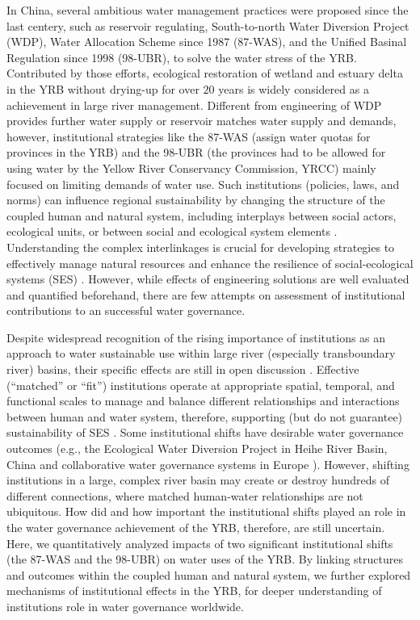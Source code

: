 In China, several ambitious water management practices were proposed since the last centery, such as reservoir regulating, South-to-north Water Diversion Project (WDP), Water Allocation Scheme since 1987 (87-WAS), and the Unified Basinal Regulation since 1998 (98-UBR), to solve the water stress of the YRB.
Contributed by those efforts, ecological restoration of wetland and estuary delta in the YRB without drying-up for over $20$ years is widely considered as a achievement in large river management.
Different from engineering of WDP provides further water supply or reservoir matches water supply and demands, however, institutional strategies like the 87-WAS (assign water quotas for provinces in the YRB) and the 98-UBR (the provinces had to be allowed for using water by the Yellow River Conservancy Commission, YRCC) mainly focused on limiting demands of water use.
Such institutions (policies, laws, and norms) can influence regional sustainability by changing the structure of the coupled human and natural system, including interplays between social actors, ecological units, or between social and ecological system elements \cite{young2008,cumming2020b,lien2020, bodin2017b}.
Understanding the complex interlinkages is crucial for developing strategies to effectively manage natural resources and enhance the resilience of social-ecological systems (SES) \cite{kluger2020}.
However, while effects of engineering solutions are well evaluated and quantified beforehand, there are few attempts on assessment of institutional contributions to an successful water governance.

Despite widespread recognition of the rising importance of institutions as an approach to water sustainable use within large river (especially transboundary river) basins, their specific effects are still in open discussion \cite{agrawal2003, persha2011, agrawal2001}.
Effective (``matched'' or ``fit'') institutions operate at appropriate spatial, temporal, and functional scales to manage and balance different relationships and interactions between human and water system, therefore, supporting (but do not guarantee) sustainability of SES \cite{epstein2015, wang2019d}.
Some institutional shifts have desirable water governance outcomes (e.g., the Ecological Water Diversion Project in Heihe River Basin, China \cite{wang2019d} and collaborative water governance systems in Europe \cite{green2013}).
However, shifting institutions in a large, complex river basin may create or destroy hundreds of different connections, where matched human-water relationships are not ubiquitous.
How did and how important the institutional shifts played an role in the water governance achievement of the YRB, therefore, are still uncertain.
Here, we quantitatively analyzed impacts of two significant institutional shifts (the 87-WAS and the 98-UBR) on water uses of the YRB.
By linking structures and outcomes within the coupled human and natural system, we further explored mechanisms of institutional effects in the YRB, for deeper understanding of institutions role in water governance worldwide.
